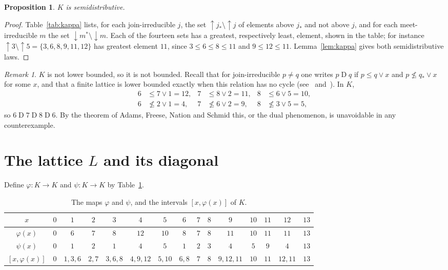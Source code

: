 \documentclass[11pt]{amsart}
\newtheorem{proposition}[theorem]{Proposition}
\theoremstyle{definition}
\theoremstyle{remark}
\newtheorem{remark}[theorem]{Remark}
\numberwithin{equation}{section}
\newcommand{\up}{{\uparrow}}
\newcommand{\dn}{{\downarrow}}
\begin{document}
\begin{proposition}\label{prop:K}
$K$ is semidistributive.
\end{proposition}

\begin{proof}
Table~\ref{tab:kappa} lists, for each join-irreducible $j$, the set $\up j_*\setminus\up j$ of elements above $j_*$ and not above $j$, and for each meet-irreducible $m$ the set $\dn m^*\setminus\dn m$. Each of the fourteen sets has a greatest, respectively least, element, shown in the table; for instance $\up3\setminus\up5=\{3,6,8,9,11,12\}$ has greatest element $11$, since $3\le6\le8\le11$ and $9\le12\le11$. Lemma~\ref{lem:kappa} gives both semidistributive laws.
\end{proof}

\begin{remark}\label{rem:D}
$K$ is not lower bounded, so it is not bounded. Recall that for join-irreducible $p\ne q$ one writes $p\mathrel{D}q$ if $p\le q\vee x$ and $p\not\le q_*\vee x$ for some $x$, and that a finite lattice is lower bounded exactly when this relation has no cycle (see~\cite[Chapter~II]{FJN} and~\cite{Da}). In $K$,
\begin{align*}
6&\le 7\vee1=12, & 7&\le 8\vee2=11, & 8&\le 6\vee5=10,\\
6&\not\le 2\vee1=4, & 7&\not\le 6\vee2=9, & 8&\not\le 3\vee5=5,
\end{align*}
so $6\mathrel{D}7\mathrel{D}8\mathrel{D}6$. By the theorem of Adams, Freese, Nation and Schmid this, or the dual phenomenon, is unavoidable in any counterexample.
\end{remark}

\section{The lattice \texorpdfstring{$L$}{L} and its diagonal}

Define $\varphi\colon K\to K$ and $\psi\colon K\to K$ by Table~\ref{tab:phi}.

\begin{table}[t]
\centering
\small
\setlength{\tabcolsep}{4.5pt}
\begin{tabular}{c*{14}{c}}
\toprule
$x$ & $0$ & $1$ & $2$ & $3$ & $4$ & $5$ & $6$ & $7$ & $8$ & $9$ & $10$ & $11$ & $12$ & $13$\\
\midrule
$\varphi(x)$ & $0$ & $6$ & $7$ & $8$ & $12$ & $10$ & $8$ & $7$ & $8$ & $11$ & $10$ & $11$ & $11$ & $13$\\
$\psi(x)$ & $0$ & $1$ & $2$ & $1$ & $4$ & $5$ & $1$ & $2$ & $3$ & $4$ & $5$ & $9$ & $4$ & $13$\\
\midrule
$[x,\varphi(x)]$ & $0$ & $1,3,6$ & $2,7$ & $3,6,8$ & $4,9,12$ & $5,10$ & $6,8$ & $7$ & $8$ & $9,12,11$ & $10$ & $11$ & $12,11$ & $13$\\
\bottomrule
\end{tabular}
\medskip
\caption{The maps $\varphi$ and $\psi$, and the intervals $[x,\varphi(x)]$ of $K$.}\label{tab:phi}
\end{table}
\end{document}
